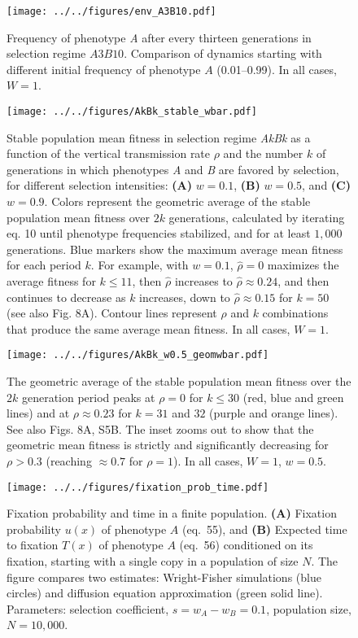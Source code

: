 \documentclass[9pt, a4paper]{extarticle}
\begin{document}
\begin{figure}
\centering
\texttt{[image: ../../figures/env\_A3B10.pdf]}
\caption{Frequency of phenotype \emph{A} after every thirteen generations in
selection regime $A3B10$. Comparison of dynamics starting with
different initial frequency of phenotype \(A\) (0.01--0.99).
In all cases, $W=1$.}\label{fig:env_A3B10}
\end{figure}

\begin{figure}
\centering
\texttt{[image: ../../figures/AkBk\_stable\_wbar.pdf]}
\caption{Stable population mean fitness in selection regime \emph{AkBk} as a function of the vertical transmission rate \(\rho\) and the number \(k\) of generations in which phenotypes \emph{A} and \emph{B} are favored by selection, for different selection intensities: \textbf{(A)} \(w=0.1\), \textbf{(B)} \(w=0.5\), and \textbf{(C)} \(w=0.9\).
Colors represent the geometric average of the stable population mean fitness over \(2k\) generations, calculated by iterating eq. 10 until phenotype frequencies stabilized, and for at least \(1,000 \) generations.
Blue markers show the maximum average mean fitness for each period \(k\).
For example, with \(w=0.1\), \(\hat{\rho}=0\) maximizes the average fitness for \(k \le 11\), then \(\hat{\rho}\) increases to \(\hat{\rho} \approx 0.24\), and then continues to decrease as \(k\) increases, down to \(\hat{\rho} \approx 0.15\) for \(k=50\) (see also Fig. 8A).
Contour lines represent \(\rho\) and \(k\) combinations that produce the same average mean fitness. 
In all cases, $W=1$.}\label{fig:AkBk_stable_wbar}
\end{figure}

\begin{figure}
\centering
\texttt{[image: ../../figures/AkBk\_w0.5\_geomwbar.pdf]}
\caption{The geometric average of the stable population mean fitness over the $2k$ generation period peaks at $\rho=0$ for $k \le 30$ (red, blue and green lines) and at $\rho \approx 0.23$ for $k=31$ and $32$ (purple and orange lines). 
See also Figs. 8A, S5B. The inset zooms out to show that the geometric mean fitness is strictly and significantly decreasing for $\rho>0.3$ (reaching $\approx 0.7$ for $\rho=1$).
In all cases, $W=1$, $w=0.5$.}\label{fig:AkBk_w0.5_geomwbar}
\end{figure}

\begin{figure}
\centering
\texttt{[image: ../../figures/fixation\_prob\_time.pdf]}
\caption{Fixation probability and time in a finite population.
\textbf{(A)} Fixation probability \(u(x)\) of phenotype \(A\) (eq.\ 55), and \textbf{(B)}
Expected time to fixation \(T(x)\) of phenotype \(A\) (eq.\ 56) conditioned on its
fixation, starting with a single copy in a population of size \(N\). The
figure compares two estimates: Wright-Fisher simulations (blue circles) and diffusion
equation approximation (green solid line). Parameters: selection coefficient, \(s=w_A-w_B=0.1\),
population size, \(N=10,000\).}\label{fixation_prob_time}
\end{figure}
\end{document}
